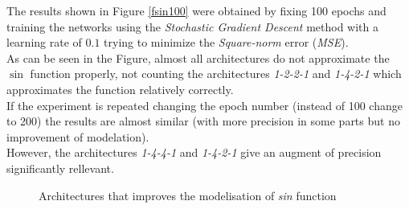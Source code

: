 \documentclass[a4paper, 11pt]{article}
\begin{document}
The results shown in Figure \ref{fsin100} were obtained 
by fixing 100 epochs and training the networks using the \textit{Stochastic Gradient Descent} method with a learning rate of $0.1$ trying to minimize the \textit{Square-norm} error (\textit{MSE}).\\
\newpage
\hspace{-1.6em}As can be seen in the Figure, almost all architectures do not approximate the $\sin$ function properly, not counting the architectures \textit{1-2-2-1} and \textit{1-4-2-1} which approximates the function relatively correctly.\\
If the experiment is repeated changing the epoch number (instead of 100 change to 200) the results are almost similar (with more precision in some parts but no improvement of modelation).\\
However, the architectures \textit{1-4-4-1} and \textit{1-4-2-1} give an augment of precision significantly rellevant.
\begin{figure}[h]
    \hspace{1em}
    \caption{Architectures that improves the modelisation of \textit{sin} function}
    \label{fsin200}
\end{figure}\\
\end{document}
